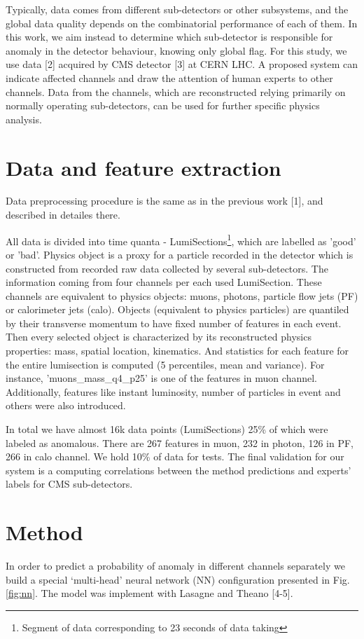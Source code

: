 \documentclass[a4paper]{jpconf}
\begin{document}
Typically, data comes from different sub-detectors or other subsystems, and the global data quality depends on the combinatorial performance of each of them. In this work, we aim instead to determine which sub-detector is responsible for anomaly in the detector behaviour, knowing only global flag. For this study, we use data [2] acquired by CMS detector [3] at CERN LHC. A proposed system can indicate affected channels and draw the attention of human experts to other channels. Data from the channels, which are reconstructed relying primarily on normally operating sub-detectors, can be used for further specific physics analysis.


\section{Data and feature extraction}
Data preprocessing procedure is the same as in the previous work [1], and described in detailes there. 

All data is divided into time quanta - LumiSections\footnote{Segment of data corresponding to 23 seconds of data taking}, which are labelled as 'good' or 'bad'. Physics object is a proxy for a particle recorded in the detector which is constructed from recorded raw data collected by  several sub-detectors. The information coming from four channels per each used LumiSection. These channels are equivalent to physics objects: muons, photons, particle flow jets (PF) or calorimeter jets (calo). Objects (equivalent to physics particles) are quantiled by their transverse momentum to have fixed number of features in each event. Then every selected object is characterized by its reconstructed physics properties: mass, spatial location, kinematics. And statistics for each feature for the entire lumisection is computed (5 percentiles, mean and variance). For instance, 'muons\_mass\_q4\_p25' is one of the features in muon channel.
Additionally, features like instant luminosity, number of particles in event and others were also introduced.

In total we have almost 16k data points (LumiSections) 25\% of which were labeled as anomalous. There are 267 features in muon, 232 in photon, 126 in PF, 266 in calo channel. We hold 10\% of data for tests. The final validation for our system is a computing correlations between the method predictions and experts’ labels for CMS sub-detectors.

\section{Method}
In order to predict a probability of anomaly in different channels separately 
we build a special ‘multi-head’ neural network (NN) configuration presented in Fig. \ref{fig:nn}. The model was implement with Lasagne and Theano [4-5].
\end{document}

